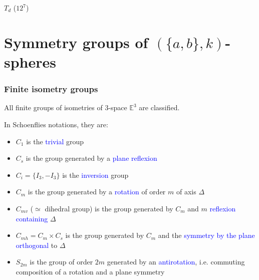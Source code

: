 \documentclass{beamer}
\begin{document}
\begin{frame}
\begin{center}
\begin{minipage}[b]{24mm}
 $T_{d}$ ($12^7$)
\end{minipage}
\end{center}  



\end{frame}

\section[]{Symmetry groups of $(\{a,b\},k)$-spheres}




\begin{frame}\frametitle{Finite isometry groups}
\vspace{-1mm}


All finite groups of isometries of $3$-space $\mathbb{E}^3$ are 
classified. 

In Schoenflies notations, they are:
\begin{itemize}
\item $C_1$ is the \textcolor{blue}{trivial} group
\item $C_s$ is the group generated by a \textcolor{blue}{plane reflexion}
\item $C_i=\{I_3, -I_3\}$ is the \textcolor{blue}{inversion} group
\item $C_m$ is the group generated by a \textcolor{blue}{rotation} of 
order 
$m$ of axis $\Delta$
\item $C_{mv}$ ($\simeq$ dihedral group) is the group generated by $C_m$ 
and $m$ \textcolor{blue}{reflexion containing} $\Delta$
\item $C_{mh}=C_m\times C_s$ is the group generated by $C_m$ and the 
\textcolor{blue}{symmetry by the plane orthogonal} to $\Delta$
\item $S_{2m}$ is the group of order $2m$ generated by an 
\textcolor{blue}{antirotation}, i.e. commuting composition of a rotation
and a plane symmetry
\end{itemize}
\end{frame}
\end{document}
